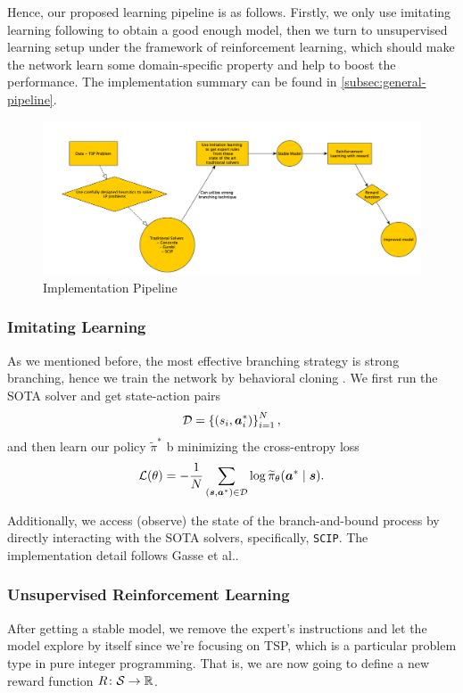\documentclass{article}
\begin{document}
Hence, our proposed learning pipeline is as follows. Firstly, we only use imitating learning following \cite{GasseCFCL19} to obtain a good enough model, then we turn to unsupervised learning setup under the framework of
reinforcement learning, which should make the network learn some domain-specific property and help to boost the performance. The implementation summary can be found in
\autoref{subsec:general-pipeline}.

\begin{figure}[H]
	\centering
	\includegraphics[width=\linewidth]{Figures/Pipeline.png}
	\caption{Implementation Pipeline}
\end{figure}

\subsubsection{Imitating Learning}
As we mentioned before, the most effective branching strategy is strong branching, hence we train the network by behavioral cloning \cite{Efficient-Training-of-artificial-Neural-Networks-for-Autonomous-Navigation}.
We first run the SOTA solver and get state-action pairs
\[
	\mathcal{\MakeUppercase{d}} = \left\{(s_{i} , \bm{a} _{i} ^\ast)\right\}_{i = 1}^N,
\]
and then learn our policy \(\widetilde{\pi} ^\ast\) b minimizing the cross-entropy loss
\[
	\mathcal{\MakeUppercase{l}} (\theta ) = - \frac{1}{N}\sum\limits_{(\bm{s}, \bm{a}^\ast)\in \mathcal{\MakeUppercase{d}} }\log \widetilde{\pi}_\theta (\bm{a} ^\ast \mid \bm{s} ).
\]

Additionally, we access (observe) the state of the branch-and-bound process by directly interacting with the SOTA solvers, specifically, \texttt{SCIP}. The implementation detail follows Gasse et al.\cite{GasseCFCL19}.

\subsubsection{Unsupervised Reinforcement Learning}
After getting a stable model, we remove the expert's instructions and let the model explore by itself since we're focusing on TSP, which is a particular problem type in pure integer programming. That is, we are now
going to define a new reward function \(R\colon \mathcal{\MakeUppercase{s}} \to \mathbb{\MakeUppercase{r}} \).
\end{document}
